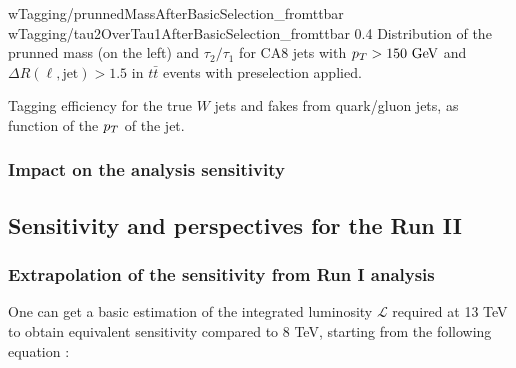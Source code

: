                              {wTagging/prunnedMassAfterBasicSelection_fromttbar}
                             {wTagging/tau2OverTau1AfterBasicSelection_fromttbar}
                             {0.4}
                             {Distribution of the prunned mass (on the left) and $\tau_2
                             / \tau_1$ for CA8 jets with $p_T > 150~\text{GeV}$ and
                             $\Delta R(\ell,\text{jet}) > 1.5$ in $t\bar{t}$ events
                             with preselection applied.}

                         {Tagging efficiency for the true $W$ jets and fakes from quark/gluon
                         jets, as function of the $p_T$ of the jet.}

            \subsubsection{Impact on the analysis sensitivity}


        \subsection{Sensitivity and perspectives for the Run II}

        \loremipsum

            \subsubsection{Extrapolation of the sensitivity from Run I analysis}

        One can get a basic estimation of the integrated luminosity $\mathcal{L}$ required
        at 13 TeV to obtain equivalent sensitivity compared to 8 TeV, starting from the
        following equation :

